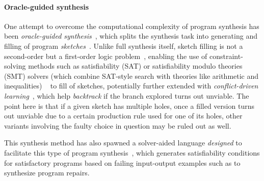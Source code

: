 \documentclass{article}
\begin{document}


\paragraph{Oracle-guided synthesis}

One attempt to overcome the computational complexity of program synthesis
has been \emph{oracle-guided synthesis}~\citep{solar2008program},
which splits the synthesis task into generating and filling of program
\emph{sketches}~\citep{murali2017neural}.
Unlike full synthesis itself, sketch filling is not a second-order but a
first-order logic problem~\citep{gulwani2017program}, enabling the use of constraint-solving methods
such as satisfiability (SAT) or satisfiability modulo theories (SMT) solvers
(which combine SAT-style search with theories like arithmetic and inequalities)%
~\citep{akiba2013calibrating,alur2013syntax,alur2016sygus,rosette,architecture}
to fill of sketches, potentially further extended with
\emph{conflict-driven learning}~\citep{feng2018program,hornclauses},
which help \emph{backtrack} if the branch explored turns out unviable.
The point here is that if a given sketch has multiple holes,
once a filled version turns out unviable due to a certain production rule used for one of its holes,
other variants involving the faulty choice in question may be ruled out as well.

This synthesis method has also spawned a solver-aided language
\emph{designed} to facilitate this type of program synthesis~\citep{rosette},
which generates satisfiability conditions for satisfactory programs
based on failing input-output examples such as to synthesize program repairs.
\end{document}
